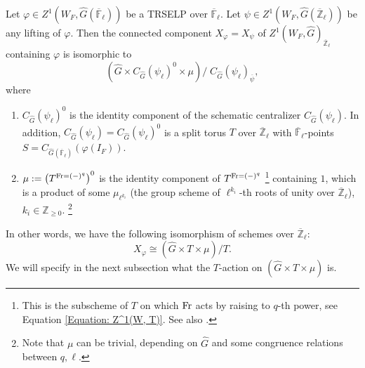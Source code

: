 \begin{theorem}\label{Thm X}
	Let $\varphi \in Z^1(W_F, \hat{G}(\overline{\mathbb{F}}_{\ell}))$ be a TRSELP over $\overline{\mathbb{F}}_{\ell}$. Let $\psi \in Z^1(W_F, \hat{G}(\overline{\mathbb{Z}}_{\ell}))$ be any lifting of $\varphi$. 
	Then the connected component $X_{\varphi}=X_{\psi}$ of $Z^1(W_F, \hat{G})_{\overline{\mathbb{Z}}_{\ell}}$ containing $\varphi$ is isomorphic to 
	$$\left(\hat{G} \times C_{\hat{G}}(\psi_{\ell})^0 \times \mu\right)/\;C_{\hat{G}}(\psi_{\ell})_{\overline{\psi}},$$
	where
	\begin{enumerate}
		\item $C_{\hat{G}}(\psi_{\ell})^0$ is the identity component of the schematic centralizer $C_{\hat{G}}(\psi_{\ell})$. In addition, $C_{\hat{G}}(\psi_{\ell})=C_{\hat{G}}(\psi_{\ell})^0$ is a split torus $T$ over $\overline{\mathbb{Z}}_{\ell}$ with $\overline{\mathbb{F}}_{\ell}$-points $S=C_{\hat{G}(\overline{\mathbb{F}}_{\ell})}(\varphi(I_F))$.
		\item $\mu:=\left(T^{\operatorname{Fr}=(-)^q}\right)^0$ is the identity component of $T^{\operatorname{Fr}=(-)^q}$ \footnote{This is the subscheme of $T$ on which $\operatorname{Fr}$ acts by raising to $q$-th power, see Equation \eqref{Equation: Z^1(W, T)}. See also \cite[Example 3.14]{dat2022ihes}.} containing $1$, which is a product of some $\mu_{\ell^{k_i}}$ (the group scheme of $\ell^{k_i}$-th roots of unity over $\overline{\mathbb{Z}}_{\ell}$), $k_i \in \mathbb{Z}_{\geq 0}$. \footnote{Note that $\mu$ can be trivial, depending on $\hat{G}$ and some congruence relations between $q, \ell$.}
	\end{enumerate}
    In other words, we have the following isomorphism of schemes over $\overline{\mathbb{Z}}_{\ell}$:
    $$X_{\varphi} \cong \left(\hat{G} \times T \times \mu\right)/T.$$
    We will specify in the next subsection what the $T$-action on $\left(\hat{G} \times T \times \mu\right)$ is.
    

\end{theorem}
